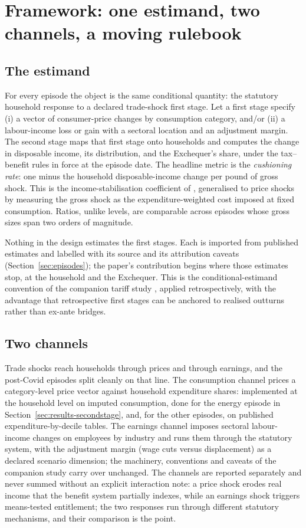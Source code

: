 \section{Framework: one estimand, two channels, a moving rulebook}\label{sec:framework}

\subsection{The estimand}

For every episode the object is the same conditional quantity: the
statutory household response to a declared trade-shock first stage. Let a
first stage specify (i) a vector of consumer-price changes by consumption
category, and/or (ii) a labour-income loss or gain with a sectoral
location and an adjustment margin. The second stage maps that first stage
onto households and computes the change in disposable income, its
distribution, and the Exchequer's share, under the tax--benefit rules in
force at the episode date. The headline metric is the \emph{cushioning rate}: one minus the
household disposable-income change per pound of gross shock. This is
the income-stabilisation coefficient of \citet{dolls2012},
generalised to price shocks by measuring the gross shock as the
expenditure-weighted cost imposed at fixed consumption. Ratios,
unlike levels, are comparable across episodes whose gross sizes span
two orders of magnitude.

Nothing in the design estimates the first stages. Each is imported from
published estimates and labelled with its source and its attribution
caveats (Section~\ref{sec:episodes}); the paper's contribution begins
where those estimates stop, at the household and the Exchequer. This is
the conditional-estimand convention of the companion tariff study
\citep{ahmadi2026}, applied retrospectively, with the advantage that
retrospective first stages can be anchored to realised outturns rather
than ex-ante bridges.

\subsection{Two channels}

Trade shocks reach households through prices and through earnings, and
the post-Covid episodes split cleanly on that line. The consumption
channel prices a category-level price vector against household
expenditure shares: implemented at the household level on imputed
consumption, done for the energy episode in
Section~\ref{sec:results-secondstage}, and, for the other episodes, on
published expenditure-by-decile tables. The earnings channel
imposes sectoral labour-income changes on employees by industry and runs
them through the statutory system, with the adjustment margin (wage cuts
versus displacement) as a declared scenario dimension; the machinery,
conventions and caveats of the companion study carry over unchanged. The
channels are reported separately and never summed without an explicit
interaction note: a price shock erodes real income that the benefit
system partially indexes, while an earnings shock triggers means-tested
entitlement; the two responses run through different statutory
mechanisms, and their comparison is the point.

